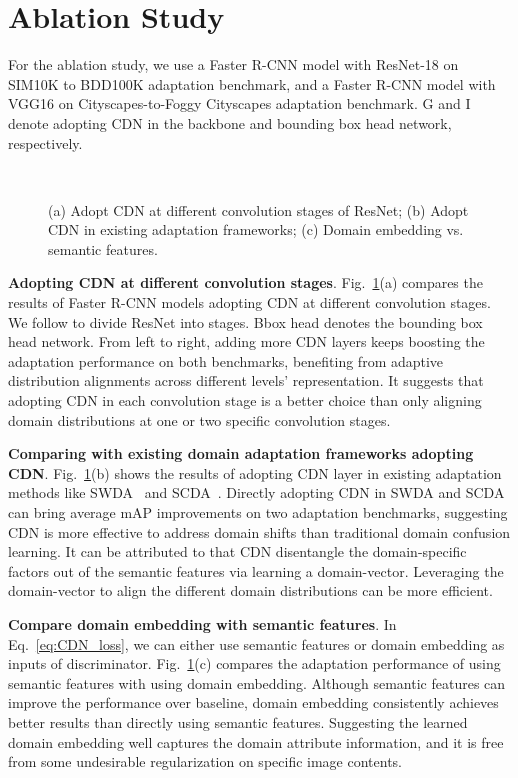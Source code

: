 \documentclass[runningheads]{llncs}
\begin{document}
\section{Ablation Study}\label{Ablation}
For the ablation study, we use a Faster R-CNN model with ResNet-18 on SIM10K to BDD100K adaptation benchmark, and a Faster R-CNN model with VGG16 on Cityscapes-to-Foggy Cityscapes adaptation benchmark.
G and I denote adopting CDN in the backbone and bounding box head network, respectively.
\begin{figure}[]
  \centering
    \\ [-1.3ex]
  \caption{(a) Adopt CDN at different convolution stages of ResNet; (b) Adopt CDN in existing adaptation frameworks; (c) Domain embedding vs. semantic features.}
  \label{fig:3-ablations}
\end{figure}

\textbf{Adopting CDN at different convolution stages}.
Fig.~\ref{fig:3-ablations}(a) compares the results of Faster R-CNN models adopting CDN at different convolution stages.
We follow \cite{he2016deep} to divide ResNet into  stages.
Bbox head denotes the bounding box head network.
From left to right, adding more CDN layers keeps boosting the adaptation performance on both benchmarks, benefiting from adaptive distribution alignments across different levels' representation.
It suggests that adopting CDN in each convolution stage is a better choice than only aligning domain distributions at one or two specific convolution stages.

\textbf{Comparing with existing domain adaptation frameworks adopting CDN}.
Fig.~\ref{fig:3-ablations}(b) shows the results of adopting CDN layer in existing adaptation methods like SWDA~\cite{Saito_2019_CVPR} and  SCDA~\cite{Zhu_2019_CVPR}.
Directly adopting CDN in SWDA and SCDA can bring average  mAP improvements on two adaptation benchmarks, suggesting CDN is more effective to address domain shifts than traditional domain confusion learning.
It can be attributed to that CDN disentangle the domain-specific factors out of the semantic features via learning a domain-vector.
Leveraging the domain-vector to align the different domain distributions can be more efficient.

\textbf{Compare domain embedding with semantic features}.
In Eq.~\ref{eq:CDN_loss}, we can either use  semantic features  or  domain embedding  as inputs of discriminator.
Fig.~\ref{fig:3-ablations}(c) compares the adaptation performance of using semantic features with using domain embedding.
Although semantic features can improve the performance over baseline, domain embedding consistently achieves better results than directly using semantic features.
Suggesting the learned domain embedding well captures the domain attribute information, and it is free from some undesirable regularization on specific image contents.
\end{document}
